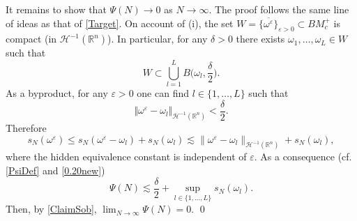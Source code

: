 \documentclass[11pt, a4paper,leqno]{amsart}
\theoremstyle{plain}
\numberwithin{equation}{section}
\theoremstyle{definition}
\theoremstyle{remark}
\def\R{\mathbb{R}}
\begin{document}
It remains to show that $\Psi(N)\rightarrow0$ as $N\rightarrow\infty$. The proof follows the same line of ideas as that of  \eqref{Target}. On
account of (i), the set $W=\overline{\{\omega^{\varepsilon}\}}_{\varepsilon > 0} \subset BM^+_c$ is compact (in
$\mathcal{H}^{-1}(\R^n)$). In particular, for any $\delta>0$ there exists
$\omega_{1},\ldots,\omega_{L}\in W$ such that
\[
W\subset\bigcup_{l=1}^{L}B\Big(\omega_{l},\frac{\delta}{2}\Big).
\]
 As a
byproduct, for any $\varepsilon>0$ one can find $l\in\{1,\ldots,L\}$ such
that
\begin{equation}
\Vert \omega^{\varepsilon}-\omega_{l} \Vert_{\mathcal{H}^{-1}(\R^n)}<\frac{\delta}%
{2}.\label{0.20new}%
\end{equation}
Therefore
\begin{equation*}
	s_N(\omega^\varepsilon) \leq s_N(\omega^\varepsilon-\omega_l) + s_N(\omega_l)  \lesssim \|\omega^\varepsilon-\omega_l\|_{\mathcal{H}^{-1}(\R^n)} +  s_N(\omega_l),
\end{equation*}
where the hidden equivalence constant is independent of $\varepsilon$. As a consequence (cf. \eqref{PsiDef} and \eqref{0.20new})
$$
	\Psi(N) \lesssim \frac{\delta}{2} + \sup_{l \in \{1, \ldots, L\}} s_N(\omega_l).
$$
Then, by  \eqref{ClaimSob},  $\lim_{N \to \infty} \Psi(N) =0$. 	\qed



%
%
\end{document}
